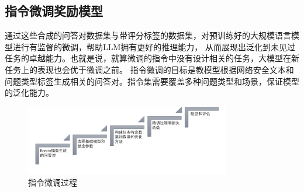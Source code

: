 \subsection{指令微调奖励模型}
通过这些合成的问答对数据集与带评分标签的数据集，对预训练好的大规模语言模型进行有监督的微调，帮助LLM拥有更好的推理能力， 从而展现出泛化到未见过任务的卓越能力。也就是说，就算微调的指令中没有设计相关的任务，大模型在新任务上的表现也会优于微调之前\cite{nayak-etal-2024-learning}。
指令微调的目标是教模型根据网络安全文本和问题类型标签生成相关的问答对。指令集需要覆盖多种问题类型和场景，保证模型的泛化能力。
\begin{figure}[htbp]
    \centering
    \includegraphics[width=0.8\textwidth]{./img/ft.png}
    \caption{指令微调过程}\label{fig:指令微调过程}
\end{figure}
